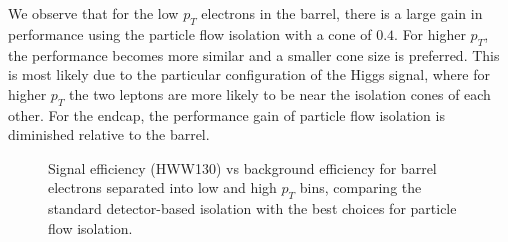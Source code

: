We observe that for the low $p_{T}$ electrons in the barrel,
there is a large gain in performance using the particle flow isolation with a cone
of $0.4$. For higher $p_{T}$, the performance becomes more similar and a smaller cone size
is preferred. This is most likely due to the particular configuration of the Higgs 
signal, where for higher $p_{T}$ the two leptons are more likely to be near the 
isolation cones of each other. For the endcap, the performance gain of particle flow 
isolation is diminished relative to the barrel. 


\begin{figure}[!htbp]
\begin{center}
\caption{Signal efficiency (HWW130) vs background efficiency for barrel electrons separated into 
low and high $p_{T}$ bins, comparing the standard detector-based isolation with the best choices 
for particle flow isolation.}
\label{fig:Electron_PFIso_BestLowPU_Barrel}
\end{center}
\end{figure}



